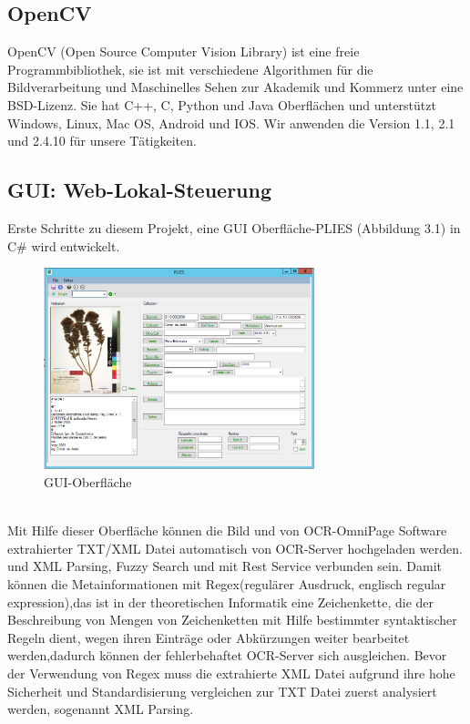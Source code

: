 \documentclass[10pt,a4paper]{report}
\begin{document}
\subsection{OpenCV}
OpenCV (Open Source Computer Vision Library) ist eine freie Programmbibliothek, sie ist mit verschiedene Algorithmen für die Bildverarbeitung und Maschinelles Sehen zur Akademik und Kommerz unter eine BSD-Lizenz. Sie hat C++, C, Python und Java Oberflächen und unterstützt Windows, Linux, Mac OS, Android und IOS. Wir anwenden die Version 1.1, 2.1 und 2.4.10 für unsere Tätigkeiten.
\subsection{GUI: Web-Lokal-Steuerung}
Erste Schritte zu diesem Projekt, eine GUI Oberfläche-PLIES (Abbildung 3.1) in C\# wird entwickelt. \\ 
\begin{figure}[htbp] 
	\centering
	\includegraphics[width=0.7\textwidth]{GUI.png}
	\caption{GUI-Oberfläche}
	\label{fig:Bild 2}
\end{figure}\\
Mit Hilfe dieser Oberfläche können die Bild und von OCR-OmniPage Software extrahierter TXT/XML Datei automatisch von OCR-Server hochgeladen werden.
und XML Parsing, Fuzzy Search und mit Rest Service verbunden sein. Damit können die Metainformationen mit Regex(regulärer Ausdruck, englisch regular expression),das ist in der theoretischen Informatik eine Zeichenkette, die der Beschreibung von Mengen von Zeichenketten mit Hilfe bestimmter syntaktischer Regeln dient, wegen ihren Einträge oder Abkürzungen weiter bearbeitet werden,dadurch können der fehlerbehaftet OCR-Server sich ausgleichen. 
Bevor der Verwendung von Regex muss die extrahierte XML Datei aufgrund ihre hohe Sicherheit und Standardisierung vergleichen zur TXT Datei zuerst analysiert werden, sogenannt XML Parsing. 
\end{document}
